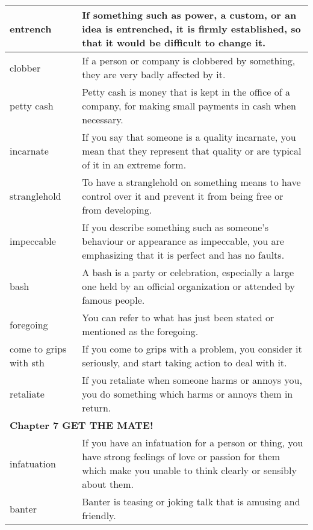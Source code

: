 \documentclass{article}
\begin{document}
\begin{center}
\begin{longtable}{|l|p{9cm}|}
\hline
entrench
&
If something such as power, a custom, or an idea is entrenched, it is firmly established, so that it would be difficult to change it.
\\

\hline
clobber
&
If a person or company is clobbered by something, they are very badly affected by it.
\\

\hline
petty cash
&
Petty cash is money that is kept in the office of a company, for making small payments in cash when necessary.
\\

\hline
incarnate
&
If you say that someone is a quality incarnate, you mean that they represent that quality or are typical of it in an extreme form.
\\

\hline
stranglehold
&
To have a stranglehold on something means to have control over it and prevent it from being free or from developing.
\\

\hline
impeccable
&
If you describe something such as someone's behaviour or appearance as impeccable, you are emphasizing that it is perfect and has no faults.
\\

\hline
bash
&
A bash is a party or celebration, especially a large one held by an official organization or attended by famous people.
\\

\hline
foregoing
&
You can refer to what has just been stated or mentioned as the foregoing.
\\

\hline
come to grips with sth
&
If you come to grips with a problem, you consider it seriously, and start taking action to deal with it.
\\

\hline
retaliate
&
If you retaliate when someone harms or annoys you, you do something which harms or annoys them in return.
\\

\hline
\multicolumn{2}{|l|}{\textbf{Chapter 7 GET THE MATE!}}
\\

\hline
infatuation
&
If you have an infatuation for a person or thing, you have strong feelings of love or passion for them which make you unable to think clearly or sensibly about them.
\\

\hline
banter
&
Banter is teasing or joking talk that is amusing and friendly.
\\


\end{longtable}
\end{center}
\end{document}
